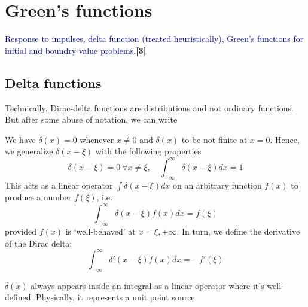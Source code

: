 \documentclass[a4paper]{article}
\begin{document}
\section{Green's functions}
{\small\textcolor{darkblue}{Response to impulses, delta function (treated heuristically), Green's functions for initial and boundry value problems.}\hfill\textbf{[3]}}
\subsection{Delta functions}
Technically, Dirac-delta functions are distributions and not ordinary functions. But after some abuse of notation, we can write
\begin{defi}
We have $\delta(x)=0$ whenever $x\neq 0$ and $\delta(x)$ to be not finite at $x=0$. Hence, we generalize $\delta(x-\xi)$ with the following properties
\begin{equation}
    \delta(x-\xi)=0~\forall x\neq\xi,\quad\int_{-\infty}^\infty\delta(x-\xi)dx=1\tag{3.1}
\end{equation}
This acts as a linear operator $\int\delta(x-\xi)dx$ on an arbitrary function $f(x)$ to produce a number $f(\xi)$, i.e.
\begin{equation}
    \int_{-\infty}^\infty\delta(x-\xi)f(x)dx=f(\xi)\tag{3.2}
\end{equation}
provided $f(x)$ is `well-behaved' at $x=\xi,\pm\infty$. In turn, we define the derivative of the Dirac delta:
\begin{equation}
    \int_{-\infty}^\infty\delta'(x-\xi)f(x)dx=-f'(\xi)\tag{3.3}
\end{equation}
\end{defi}
\begin{remarks}
$\delta(x)$ always appears inside an integral as a linear operator where it's well-defined. Physically, it represents a unit point source.
\end{remarks}
\end{document}
